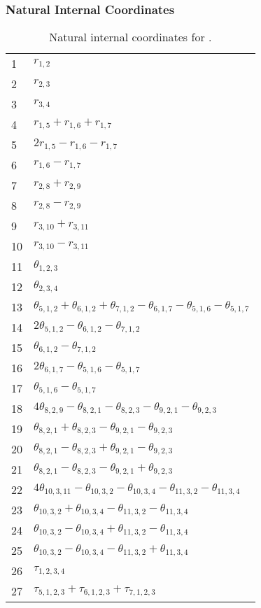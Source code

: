 \documentclass[10pt,oneside]{article}
\begin{document}
\begin{table}[h!]
\subsubsection*{Natural Internal Coordinates}
\centering
\caption{Natural internal coordinates for .}
\small
\begin{tabular}{ll}
\toprule
  1   & $r_{1,2}$ \\
  2   & $r_{2,3}$ \\
  3   & $r_{3,4}$ \\
  4   & $r_{1,5} + r_{1,6} + r_{1,7}$ \\
  5   & $2r_{1,5} - r_{1,6} - r_{1,7}$ \\
  6   & $r_{1,6} - r_{1,7}$ \\
  7   & $r_{2,8} + r_{2,9}$ \\
  8   & $r_{2,8} - r_{2,9}$ \\
  9   & $r_{3,10} + r_{3,11}$ \\
  10  & $r_{3,10} - r_{3,11}$ \\
  11  & $\theta_{1,2,3}$ \\
  12  & $\theta_{2,3,4}$ \\
  13  & $\theta_{5,1,2} + \theta_{6,1,2} + \theta_{7,1,2} - \theta_{6,1,7} - \theta_{5,1,6} - \theta_{5,1,7}$ \\
  14  & $2\theta_{5,1,2} - \theta_{6,1,2} - \theta_{7,1,2}$ \\
  15  & $\theta_{6,1,2} - \theta_{7,1,2}$ \\
  16  & $2\theta_{6,1,7} - \theta_{5,1,6} - \theta_{5,1,7}$ \\
  17  & $\theta_{5,1,6} - \theta_{5,1,7}$ \\
  18  & $4\theta_{8,2,9} - \theta_{8,2,1} - \theta_{8,2,3} - \theta_{9,2,1} - \theta_{9,2,3}$ \\
  19  & $\theta_{8,2,1} + \theta_{8,2,3} - \theta_{9,2,1} - \theta_{9,2,3}$ \\
  20  & $\theta_{8,2,1} - \theta_{8,2,3} + \theta_{9,2,1} - \theta_{9,2,3}$ \\
  21  & $\theta_{8,2,1} - \theta_{8,2,3} - \theta_{9,2,1} + \theta_{9,2,3}$ \\
  22  & $4\theta_{10,3,11} - \theta_{10,3,2} - \theta_{10,3,4} - \theta_{11,3,2} - \theta_{11,3,4}$ \\
  23  & $\theta_{10,3,2} + \theta_{10,3,4} - \theta_{11,3,2} - \theta_{11,3,4}$ \\
  24  & $\theta_{10,3,2} - \theta_{10,3,4} + \theta_{11,3,2} - \theta_{11,3,4}$ \\
  25  & $\theta_{10,3,2} - \theta_{10,3,4} - \theta_{11,3,2} + \theta_{11,3,4}$ \\
  26  & $\tau_{1,2,3,4}$ \\
  27  & $\tau_{5,1,2,3} + \tau_{6,1,2,3} + \tau_{7,1,2,3}$ \\
\bottomrule
\end{tabular}
\end{table}
\end{document}
